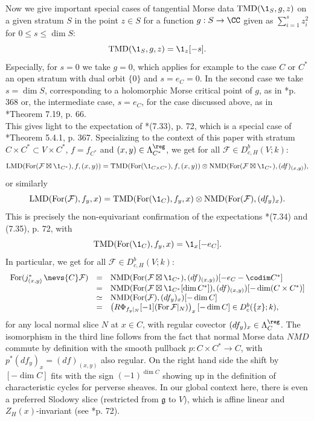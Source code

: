 \documentclass[11pt,letterpaper]{amsart}
\numberwithin{equation}{section}
\begin{document}
Now we give important special cases of tangential Morse data $\operatorname{TMD}(\1_{S},g,z)$ on a given stratum $S$ in the point $z\in S$ for a function $g : S\to \CC$ given as $\sum_{i=1}^s z_i^2$ for $0\leq s\leq \dim S$:
\[
\operatorname{TMD}(\1_{S},g,z)= \1_{z}[-s].
\]
Especially, for $s=0$ we take $g=0$, which applies for example to the case $C$ or $C^*$ an open stratum with dual orbit $\{0\}$ and $s=e_C=0$.
In the second case we take $s= \dim S$, corresponding to a holomorphic Morse critical point of $g$, as in \cite{Sch03}*{p. 368} or, the intermediate case, $s = e_C$, for the case discussed above, as in \cite{CFK22}*{Theorem 7.19, p. 66}.\\

This gives light to the expectation of \cite{CFMMX22}*{(7.33), p. 72}, which is a special case of \cite{Sch03}*{Theorem 5.4.1, p. 367}.
Specializing to the context of this paper with stratum $C\times C^*\subset V\times C^*$, $f = f_{C^*}$ and $(x,y)\in \Lambda_{C^*}^\reg$, 
we get for all $\mathcal{F}\in D^b_{c,H}(V;k)$:
\[
\operatorname{LMD}( \operatorname{For}(\mathcal{F}\boxtimes \1_{C^*}),f,(x,y))
=
\operatorname{TMD}(\operatorname{For}(\1_{C\times C^*}),f,(x,y))
\otimes
\operatorname{NMD}(\operatorname{For}(\mathcal{F}\boxtimes \1_{C^*}),(df)_{(x,y)}),
\]
or similarly
\[
\operatorname{LMD}( \operatorname{For}(\mathcal{F}),f_y,x)
=
\operatorname{TMD}(\operatorname{For}(\1_{C}),f_y,x)
\otimes
\operatorname{NMD}(\operatorname{For}(\mathcal{F}),(df_y)_x).
\]
This is precisely the non-equivariant confirmation of the expectations 
\cite{CFMMX22}*{(7.34) and (7.35), p. 72}, with
\[
\operatorname{TMD}(\operatorname{For}(\1_{C}),f_y,x) = \1_{x}[-e_C].
\]
In particular, we get for all $\mathcal{F}\in D^b_{c,H}(V;k)$:
\begin{equation}\label{equation: NMD}
\begin{array}{rcl}
\operatorname{For}(j_{(x,y)}^*\, \nevs{C}\mathcal{F})
&=& 
\operatorname{NMD}(\operatorname{For}(\mathcal{F}\boxtimes\1_{C^*}),(df)_{(x,y)})
[-e_C-\codim C^*]\\
&=&
\operatorname{NMD}(\operatorname{For}(\mathcal{F}\boxtimes\1_{C^*}[\dim C^*]),(df)_{(x,y)})[-\dim (C\times C^*)]\\
&\simeq&
\operatorname{NMD}(\operatorname{For}(\mathcal{F}),(df_y)_x)[-\dim C]\\
&=& 
\left(R\Phi_{f_y\vert_{N}}[-1](\operatorname{For}\mathcal{F}\vert_{N})\right)_x
[-\dim C] \in D^b_{c}(\{x\};k),
\end{array}
\end{equation}
for any local normal slice $N$ at $x\in C$, with regular covector $(df_y)_x \in \Lambda_C^\reg$.
The isomorphism in the third line follows from the fact that normal Morse data $NMD$ commute by definition with the smooth pullback $p: C\times C^*\to C$, with $p^*(df_y)_x=(df)_{(x,y)}$ also regular.
On the right hand side the shift by $[-\dim C]$ fits with the sign $(-1)^{\dim C}$ showing up in the definition of characteristic cycles for perverse sheaves.
In our global context here,  there is even a preferred  Slodowy slice (restricted from $\mathfrak{g}$ to $V$),
which is affine linear and $Z_{H}(x)$-invariant (see \cite{CFMMX22}*{p. 72}).\\
\end{document}
